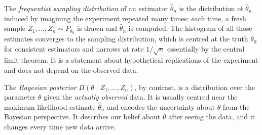 The \textit{frequentist sampling distribution} of an estimator $\hat\theta_n$ is the distribution of $\hat\theta_n$ induced by imagining the experiment repeated many times: each time, a fresh sample $Z_1,\ldots,Z_n \sim P_{\theta_0}$ is drawn and $\hat\theta_n$ is computed. The histogram of all those estimates converges to the sampling distribution, which is centred at the truth $\theta_0$ for consistent estimators and narrows at rate $1/\sqrt{n}$ essentially by the central limit theorem. It is a statement about hypothetical replications of the experiment and does not depend on the observed data.

The \textit{Bayesian posterior} $\Pi(\theta \mid Z_1,\ldots,Z_n)$, by contrast, is a distribution over the parameter $\theta$ given the \emph{actually observed} data. It is usually centred near the maximum likelihood estimate $\hat\theta_n$ and encodes the uncertainty about $\theta$ from the Bayesian perspective. It describes our belief about $\theta$ after seeing the data, and it changes every time new data arrive.
